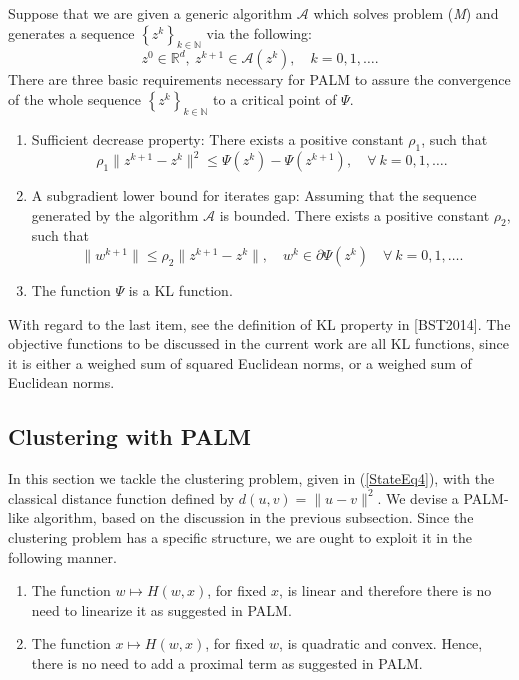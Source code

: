 \documentclass[11pt]{article}
\numberwithin{equation}{section}
\begin{document}
Suppose that we are given a generic algorithm $\mathcal{A}$ which solves problem (\textit{M}) and generates a sequence $\left\lbrace z^k \right\rbrace_{k \in \mathbb{N}}$ via the following:
\begin{equation*}
	z^0 \in \mathbb{R}^d, \: z^{k+1} \in \mathcal{A}\left(z^k\right), \quad k=0,1,\ldots.
\end{equation*}
There are three basic requirements necessary for PALM to assure the convergence of the whole sequence $\left\lbrace z^k \right\rbrace_{k \in \mathbb{N}}$ to a critical point of $\Psi$.
\begin{enumerate}[(1)]
	\item Sufficient decrease property: There exists a positive constant $\rho_1$, such that
	\begin{equation*}
		\rho_1 \|z^{k+1} - z^k\|^2 \leq \Psi(z^k) - \Psi(z^{k+1}), \quad \forall \: k=0,1,\ldots .
	\end{equation*}
	\item A subgradient lower bound for iterates gap: Assuming that the sequence generated by the algorithm $\mathcal{A}$ is bounded. There exists a positive constant $\rho_2$, such that
	\begin{equation*}
		\|w^{k+1}\| \leq \rho_2 \|z^{k+1} - z^k\|, \quad w^k \in \partial \Psi\left( z^k \right) \quad \forall \: k=0,1,\ldots .
	\end{equation*}
	\item The function $\Psi$ is a KL function.
\end{enumerate}
With regard to the last item, see the definition of KL property in [BST2014]. The objective functions to be discussed in the current work are all KL functions, since it is either a weighed sum of squared Euclidean norms, or a weighed sum of Euclidean norms.

\subsection{Clustering with PALM}

In this section we tackle the clustering problem, given in (\ref{StateEq4}), with the classical distance function defined by $d(u,v) = \|u-v\|^2$. We devise a PALM-like algorithm, based on the discussion in the previous subsection.
Since the clustering problem has a specific structure, we are ought to exploit it in the following manner.
\begin{enumerate}[(1)]
	\item The function $w \mapsto H(w,x)$, for fixed $x$, is linear and therefore there is no need to linearize it as suggested in PALM.
	\item The function $x \mapsto H(w,x)$, for fixed $w$, is quadratic and convex. Hence, there is no need to add a proximal term as suggested in PALM.
\end{enumerate}
\end{document}
